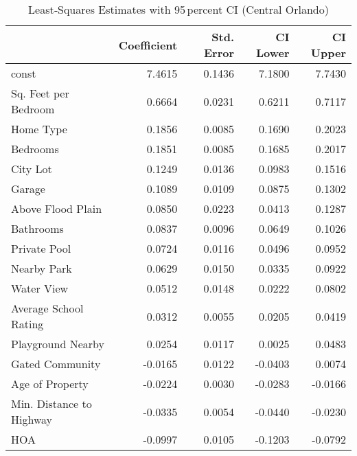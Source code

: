 \begin{table}
\caption{Least‑Squares Estimates with 95 percent CI (Central Orlando)}
\label{tab:ols_coeffs_c}
\begin{tabular}{lrrrr}
\toprule
 & Coefficient & Std. Error & CI Lower & CI Upper \\
\midrule
const & 7.4615 & 0.1436 & 7.1800 & 7.7430 \\
Sq. Feet per Bedroom & 0.6664 & 0.0231 & 0.6211 & 0.7117 \\
Home Type & 0.1856 & 0.0085 & 0.1690 & 0.2023 \\
Bedrooms & 0.1851 & 0.0085 & 0.1685 & 0.2017 \\
City Lot & 0.1249 & 0.0136 & 0.0983 & 0.1516 \\
Garage & 0.1089 & 0.0109 & 0.0875 & 0.1302 \\
Above Flood Plain & 0.0850 & 0.0223 & 0.0413 & 0.1287 \\
Bathrooms & 0.0837 & 0.0096 & 0.0649 & 0.1026 \\
Private Pool & 0.0724 & 0.0116 & 0.0496 & 0.0952 \\
Nearby Park & 0.0629 & 0.0150 & 0.0335 & 0.0922 \\
Water View & 0.0512 & 0.0148 & 0.0222 & 0.0802 \\
Average School Rating & 0.0312 & 0.0055 & 0.0205 & 0.0419 \\
Playground Nearby & 0.0254 & 0.0117 & 0.0025 & 0.0483 \\
Gated Community & -0.0165 & 0.0122 & -0.0403 & 0.0074 \\
Age of Property & -0.0224 & 0.0030 & -0.0283 & -0.0166 \\
Min. Distance to Highway & -0.0335 & 0.0054 & -0.0440 & -0.0230 \\
HOA & -0.0997 & 0.0105 & -0.1203 & -0.0792 \\
\bottomrule
\end{tabular}
\end{table}
